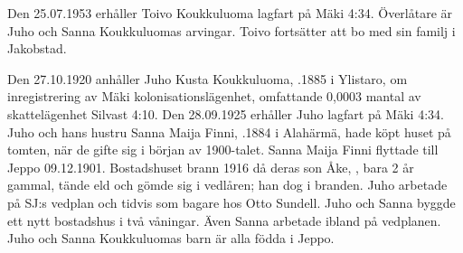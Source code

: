 Den 25.07.1953 erhåller Toivo Koukkuluoma lagfart på Mäki 4:34.	Överlåtare är Juho och Sanna Koukkuluomas arvingar. Toivo fortsätter att bo med sin familj i Jakobstad.


Den 27.10.1920 anhåller Juho Kusta Koukkuluoma, .1885 i Ylistaro, om inregistrering av Mäki kolonisationslägenhet, omfattande 0,0003 mantal av skattelägenhet Silvast 4:10. Den 28.09.1925 erhåller Juho lagfart på Mäki 4:34. Juho och hans hustru Sanna Maija Finni, .1884 i Alahärmä, hade köpt huset på tomten, när de gifte sig i början av 1900-talet. Sanna Maija Finni flyttade till Jeppo 09.12.1901.	Bostadshuset brann 1916 då deras son Åke, , bara 2 år gammal, tände eld och 	gömde sig i vedlåren; han dog i branden. Juho arbetade på SJ:s vedplan och tidvis som bagare hos Otto Sundell. Juho och Sanna byggde	ett nytt bostadshus i två våningar. Även Sanna arbetade ibland på 	vedplanen. Juho och Sanna Koukkuluomas barn är alla födda i Jeppo.
\begin{jhchildren}
  \item {}
  \item {}
  \item {}
  \item {}
  \item {}
  \item {}
  \item {}
  \item {}
  \item {}
  \item {}
\end{jhchildren}

